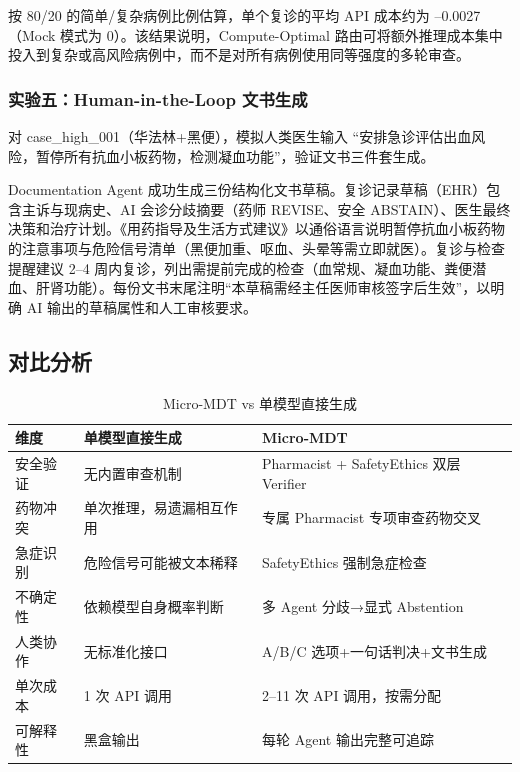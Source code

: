 \documentclass[11pt,a4paper]{ctexart}
\begin{document}
按 80/20 的简单/复杂病例比例估算，单个复诊的平均 API 成本约为 --0.0027（Mock 模式为 0）。该结果说明，Compute-Optimal 路由可将额外推理成本集中投入到复杂或高风险病例中，而不是对所有病例使用同等强度的多轮审查。

\subsubsection{实验五：Human-in-the-Loop 文书生成}

对 case\_high\_001（华法林+黑便），模拟人类医生输入 ``安排急诊评估出血风险，暂停所有抗血小板药物，检测凝血功能''，验证文书三件套生成。

Documentation Agent 成功生成三份结构化文书草稿。复诊记录草稿（EHR）包含主诉与现病史、AI 会诊分歧摘要（药师 REVISE、安全 ABSTAIN）、医生最终决策和治疗计划。《用药指导及生活方式建议》以通俗语言说明暂停抗血小板药物的注意事项与危险信号清单（黑便加重、呕血、头晕等需立即就医）。复诊与检查提醒建议 2--4 周内复诊，列出需提前完成的检查（血常规、凝血功能、粪便潜血、肝肾功能）。每份文书末尾注明``本草稿需经主任医师审核签字后生效''，以明确 AI 输出的草稿属性和人工审核要求。

\subsection{对比分析}

\begin{table}[H]
\centering
\caption{Micro-MDT vs 单模型直接生成}
\label{tab:comparison}
\small
\begin{tabular}{p{3cm} p{4.5cm} p{4.5cm}}
\toprule
\textbf{维度} & \textbf{单模型直接生成} & \textbf{Micro-MDT} \\
\midrule
安全验证 & 无内置审查机制 & Pharmacist + SafetyEthics 双层 Verifier \\
药物冲突 & 单次推理，易遗漏相互作用 & 专属 Pharmacist 专项审查药物交叉 \\
急症识别 & 危险信号可能被文本稀释 & SafetyEthics 强制急症检查 \\
不确定性 & 依赖模型自身概率判断 & 多 Agent 分歧→显式 Abstention \\
人类协作 & 无标准化接口 & A/B/C 选项+一句话判决+文书生成 \\
单次成本 & 1 次 API 调用 & 2--11 次 API 调用，按需分配 \\
可解释性 & 黑盒输出 & 每轮 Agent 输出完整可追踪 \\
\bottomrule
\end{tabular}
\end{table}
\end{document}
